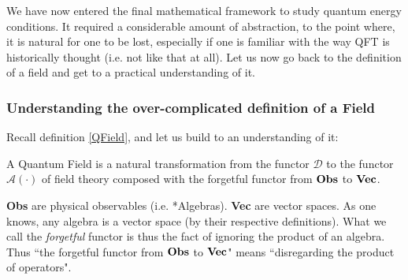 \documentclass[a4paper,11pt]{article}
\numberwithin{equation}{section}
\theoremstyle{definition}
\newtheorem{comment}{Comment}
\begin{document}

We have now entered the final mathematical framework to study quantum energy conditions. It required a considerable amount of abstraction, to the point where, it is natural for one to be lost, especially if one is familiar with the way QFT is historically thought (i.e. not like that at all). Let us now go back to the definition of a field and get to a practical understanding of it.
\subsubsection{Understanding the over-complicated definition of a Field}
Recall definition \ref{QField}, and let us build to an understanding of it:
\begin{center}
    A Quantum Field is a natural transformation from the functor $\mathcal{D}$ to the functor\\ $\mathcal{A}(\cdot)$ of field theory composed with the forgetful functor from $\bold{Obs}$ to $\bold{Vec}$.
\end{center}
\textbf{Obs} are physical observables (i.e. *Algebras). \textbf{Vec} are vector spaces. As one knows, any algebra is a vector space (by their respective definitions). What we call the \emph{forgetful} functor is thus the fact of ignoring the product of an algebra. Thus ``the forgetful functor from $\bold{Obs}$ to $\bold{Vec}$" means ``disregarding the product of operators".\\
\end{document}

